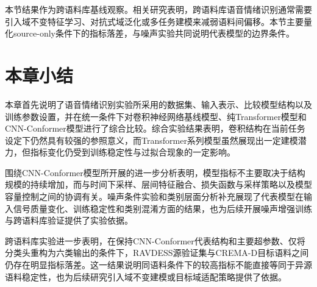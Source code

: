  
本节结果作为跨语料库基线观察。相关研究表明，跨语料库语音情绪识别通常需要引入域不变特征学习、对抗式域泛化或多任务建模来减弱语料间偏移\cite{zhang2020transfer,luo2020nonnegative,lu2022domain,su2023unsupervised,ahn2025multitask,gao2024adversarial}。本节主要量化source-only条件下的指标落差，与噪声实验共同说明代表模型的边界条件。

\section{本章小结}

本章首先说明了语音情绪识别实验所采用的数据集、输入表示、比较模型结构以及训练参数设置，并在统一条件下对卷积神经网络基线模型、纯Transformer模型和CNN-Conformer模型进行了综合比较。综合实验结果表明，卷积结构在当前任务设定下仍然具有较强的参照意义，而Transformer系列模型虽然展现出一定建模潜力，但指标变化仍受到训练稳定性与过拟合现象的一定影响。

围绕CNN-Conformer模型所开展的进一步分析表明，模型指标不主要取决于结构规模的持续增加，而与时间下采样、层间特征融合、损失函数与采样策略以及模型容量控制之间的协调有关。噪声条件实验和类别层面分析补充展现了代表模型在输入信号质量变化、训练稳定性和类别混淆方面的结果，也为后续开展噪声增强训练与跨语料库验证提供了实验依据。

跨语料库实验进一步表明，在保持CNN-Conformer代表结构和主要超参数、仅将分类头重构为六类输出的条件下，RAVDESS源验证集与CREMA-D目标语料之间仍存在明显指标落差。这一结果说明同语料条件下的较高指标不能直接等同于异源语料稳定性，也为后续研究引入域不变建模或目标域适配策略提供了依据。
